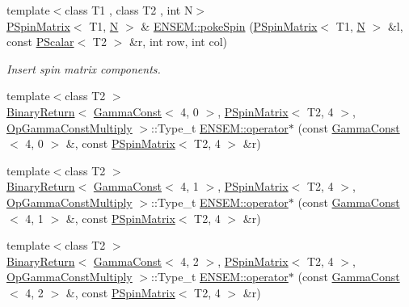 \begin{DoxyCompactItemize}
\item 
{\footnotesize template$<$class T1 , class T2 , int N$>$ }\\\mbox{\hyperlink{classENSEM_1_1PSpinMatrix}{P\+Spin\+Matrix}}$<$ T1, \mbox{\hyperlink{adat__devel_2lib_2hadron_2operator__name__util_8cc_a7722c8ecbb62d99aee7ce68b1752f337}{N}} $>$ \& \mbox{\hyperlink{group__primspinmatrix_ga79a215ef6e9982decb24addd77e93dae}{E\+N\+S\+E\+M\+::poke\+Spin}} (\mbox{\hyperlink{classENSEM_1_1PSpinMatrix}{P\+Spin\+Matrix}}$<$ T1, \mbox{\hyperlink{adat__devel_2lib_2hadron_2operator__name__util_8cc_a7722c8ecbb62d99aee7ce68b1752f337}{N}} $>$ \&l, const \mbox{\hyperlink{classENSEM_1_1PScalar}{P\+Scalar}}$<$ T2 $>$ \&r, int row, int col)
\begin{DoxyCompactList}\small\item\em Insert spin matrix components. \end{DoxyCompactList}\item 
{\footnotesize template$<$class T2 $>$ }\\\mbox{\hyperlink{structENSEM_1_1BinaryReturn}{Binary\+Return}}$<$ \mbox{\hyperlink{classENSEM_1_1GammaConst}{Gamma\+Const}}$<$ 4, 0 $>$, \mbox{\hyperlink{classENSEM_1_1PSpinMatrix}{P\+Spin\+Matrix}}$<$ T2, 4 $>$, \mbox{\hyperlink{structENSEM_1_1OpGammaConstMultiply}{Op\+Gamma\+Const\+Multiply}} $>$\+::Type\+\_\+t \mbox{\hyperlink{group__primspinmatrix_ga3c278ae3c7e7dc6db3a144f463999af2}{E\+N\+S\+E\+M\+::operator$\ast$}} (const \mbox{\hyperlink{classENSEM_1_1GammaConst}{Gamma\+Const}}$<$ 4, 0 $>$ \&, const \mbox{\hyperlink{classENSEM_1_1PSpinMatrix}{P\+Spin\+Matrix}}$<$ T2, 4 $>$ \&r)
\item 
{\footnotesize template$<$class T2 $>$ }\\\mbox{\hyperlink{structENSEM_1_1BinaryReturn}{Binary\+Return}}$<$ \mbox{\hyperlink{classENSEM_1_1GammaConst}{Gamma\+Const}}$<$ 4, 1 $>$, \mbox{\hyperlink{classENSEM_1_1PSpinMatrix}{P\+Spin\+Matrix}}$<$ T2, 4 $>$, \mbox{\hyperlink{structENSEM_1_1OpGammaConstMultiply}{Op\+Gamma\+Const\+Multiply}} $>$\+::Type\+\_\+t \mbox{\hyperlink{group__primspinmatrix_gafa6af9df04bb90ce7675e5c8f4b13ac8}{E\+N\+S\+E\+M\+::operator$\ast$}} (const \mbox{\hyperlink{classENSEM_1_1GammaConst}{Gamma\+Const}}$<$ 4, 1 $>$ \&, const \mbox{\hyperlink{classENSEM_1_1PSpinMatrix}{P\+Spin\+Matrix}}$<$ T2, 4 $>$ \&r)
\item 
{\footnotesize template$<$class T2 $>$ }\\\mbox{\hyperlink{structENSEM_1_1BinaryReturn}{Binary\+Return}}$<$ \mbox{\hyperlink{classENSEM_1_1GammaConst}{Gamma\+Const}}$<$ 4, 2 $>$, \mbox{\hyperlink{classENSEM_1_1PSpinMatrix}{P\+Spin\+Matrix}}$<$ T2, 4 $>$, \mbox{\hyperlink{structENSEM_1_1OpGammaConstMultiply}{Op\+Gamma\+Const\+Multiply}} $>$\+::Type\+\_\+t \mbox{\hyperlink{group__primspinmatrix_ga55de5be902e508670e59d7c11c319618}{E\+N\+S\+E\+M\+::operator$\ast$}} (const \mbox{\hyperlink{classENSEM_1_1GammaConst}{Gamma\+Const}}$<$ 4, 2 $>$ \&, const \mbox{\hyperlink{classENSEM_1_1PSpinMatrix}{P\+Spin\+Matrix}}$<$ T2, 4 $>$ \&r)

\end{DoxyCompactItemize}
